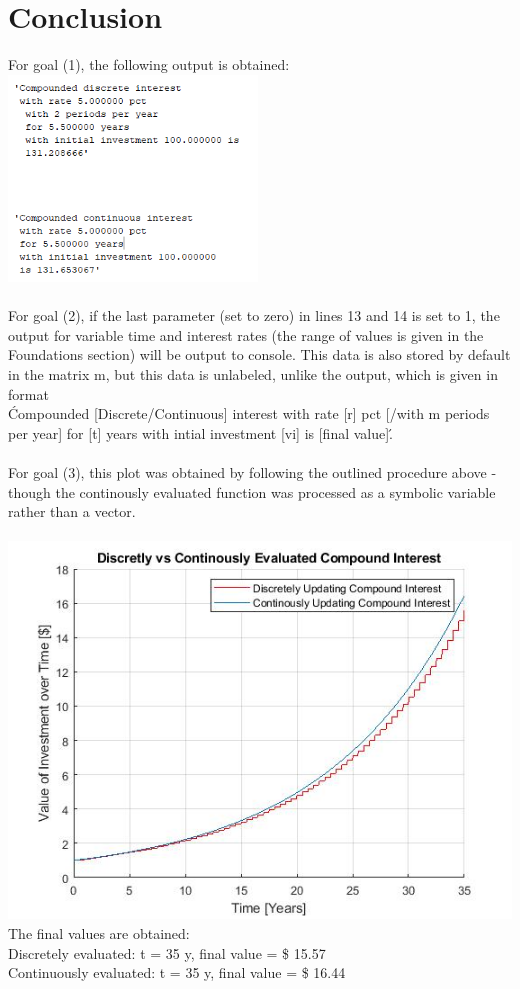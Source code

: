 \documentclass[10pt]{report}
\begin{document}
    \section*{Conclusion}
    For goal (1), the following output is obtained:\\
    \includegraphics[width=250px]{Capture.PNG}\\\\
    For goal (2), if the last parameter (set to zero) in lines 13 and 14 is set to 1, the output for variable time and interest rates   (the range of values is given in the Foundations section) will be output to console. This data is also stored by default in the matrix m, but this data is unlabeled, unlike the output, which is given in format\\ \'Compounded [Discrete/Continuous] interest with rate [r] pct [/with m periods per year] for [t] years with intial investment [vi] is  [final value]\'. \\\\
    For goal (3), this plot was obtained by following the outlined procedure above - though the continously evaluated function was processed as a symbolic variable rather than a vector. \\\\
    \includegraphics[width=\textwidth]{graph_final_2d.jpg}
    The final values are obtained:\\
    Discretely evaluated: t  = 35 y, final value = \$ 15.57\\
    Continuously evaluated: t = 35 y, final value = \$ 16.44\\\\
\end{document}

